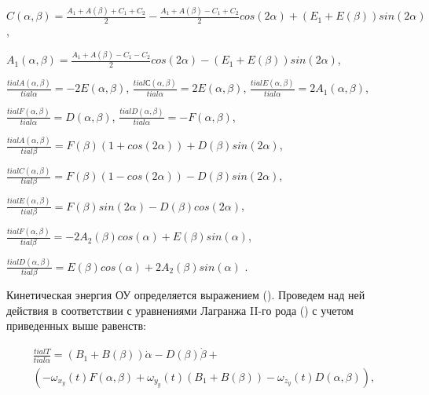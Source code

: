 \( C \left( \alpha, \beta \right) =\frac{A_{1}+A \left( \beta \right) +C_{1}+C_{2}}{2}-\frac{A_{1}+A \left( \beta \right) -C_{1}+C_{2}}{2}cos \left( 2 \alpha \right) + \left( E_{1}+E \left( \beta \right) \right) sin \left( 2 \alpha \right) \), 

\( A_{1} \left( \alpha, \beta \right) =\frac{A_{1}+A \left( \beta \right) -C_{1}-C_{2}}{2}cos \left( 2 \alpha \right) - \left( E_{1}+E \left( \beta \right) \right) sin \left( 2 \alpha \right) \), 

\( \frac{ tial A \left( \alpha, \beta \right) }{ tial \alpha }=-2E \left( \alpha, \beta \right) \), \( \frac{ tial С \left( \alpha, \beta \right) }{ tial \alpha }=2E \left( \alpha, \beta \right) \), \( \frac{ tial E \left( \alpha, \beta \right) }{ tial \alpha }=2A_{1} \left( \alpha, \beta \right) \), 

\( \frac{ tial F \left( \alpha, \beta \right) }{ tial \alpha }=D \left( \alpha, \beta \right) \), \( \frac{ tial D \left( \alpha, \beta \right) }{ tial \alpha }=-F \left( \alpha, \beta \right) \), 

\( \frac{ tial A \left( \alpha, \beta \right) }{ tial \beta }=F \left( \beta \right) \left( 1+cos \left( 2 \alpha \right) \right) +D \left( \beta \right) sin \left( 2 \alpha \right) \), 

\( \frac{ tial C \left( \alpha, \beta \right) }{ tial \beta }=F \left( \beta \right) \left( 1-cos \left( 2 \alpha \right) \right) -D \left( \beta \right) sin \left( 2 \alpha \right) \), 

\( \frac{ tial E \left( \alpha, \beta \right) }{ tial \beta }=F \left( \beta \right) sin \left( 2 \alpha \right) -D \left( \beta \right) cos \left( 2 \alpha \right) \), 

\( \frac{ tial F \left( \alpha, \beta \right) }{ tial \beta }=-2A_{2} \left( \beta \right) cos \left( \alpha \right) +E \left( \beta \right) sin \left( \alpha \right) \), 

\( \frac{ tial D \left( \alpha, \beta \right) }{ tial \beta }=E \left( \beta \right) cos \left( \alpha \right) +2A_{2} \left( \beta \right) sin \left( \alpha \right) \) . 

Кинетическая энергия ОУ определяется выражением (). Проведем над ней действия в соответствии с уравнениями Лагранжа II-го рода () с учетом приведенных выше равенств: 

\begin{equation}%
\label{eq:p3:42}
\begin{multlined}
\frac{ tial T}{ tial \dot \alpha}= 
(B_1 + B(\beta)) \dot{\alpha} - 
 D(\beta) \dot{\beta} + \\
(
	-\omega_{x_y} (t) F(\alpha, \beta)
	+\omega_{y_y} (t) (B_1 + B(\beta))
	-\omega_{z_y} (t) D(\alpha, \beta)
),
\end{multlined}
\end{equation}


